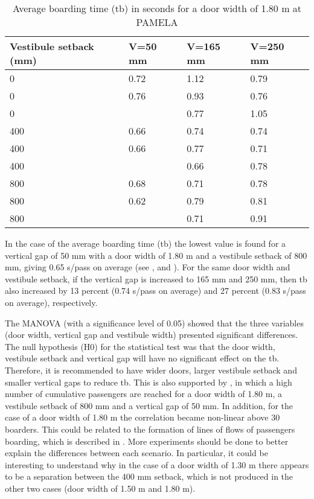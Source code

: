 \begin{table}
  \centering
  \begin{tabular}{llll}
    \toprule
    Vestibule setback (mm) & V=50 mm & V=165 mm & V=250 mm \\
    \midrule
        0 & 0.72 & 1.12 & 0.79  \\
        0 & 0.76 & 0.93 & 0.76  \\
		0 &      & 0.77 & 1.05  \\
		400 & 0.66 & 0.74 & 0.74  \\
		400 & 0.66 & 0.77 & 0.71  \\
		400 &      & 0.66 & 0.78  \\
		800 & 0.68 & 0.71 & 0.78  \\
		800 & 0.62 & 0.79 & 0.81  \\
		800 &      & 0.71 & 0.91  \\
	\bottomrule
  \end{tabular}
  \caption{Average boarding time (tb) in seconds for a door width of 1.80 m at PAMELA}
  \label{tab:3} %
\end{table}

In the case of the average boarding time (tb) the lowest value is found for a vertical gap of 50 mm with a door width of 1.80 m and a vestibule setback of 800 mm, giving 0.65 s/pass on average (see ,  and ). For the same door width and vestibule setback, if the vertical gap is increased to 165 mm and 250 mm, then tb also increased by 13 percent (0.74 s/pass on average) and 27 percent (0.83 s/pass on average), respectively. 

The MANOVA (with a significance level of 0.05) showed that the three variables (door width, vertical gap and vestibule width) presented significant differences. The null hypothesis (H0) for the statistical test was that the door width, vestibule setback and vertical gap will have no significant effect on the tb. Therefore, it is recommended to have wider doors, larger vestibule setback and smaller vertical gaps to reduce tb. This is also supported by , in which a high number of cumulative passengers are reached for a door width of 1.80 m, a vestibule setback of 800 mm and a vertical gap of 50 mm. In addition, for the case of a door width of 1.80 m the correlation became non-linear above 30 boarders. This could be related to the formation of lines of flows of passengers boarding, which is described in \cite{Ref37,Ref38, Ref39, Ref40}. More experiments should be done to better explain the differences between each scenario. In particular, it could be interesting to understand why in the case of a door width of 1.30 m there appears to be a separation between the 400 mm setback, which is not produced in the other two cases (door width of 1.50 m and 1.80 m).

